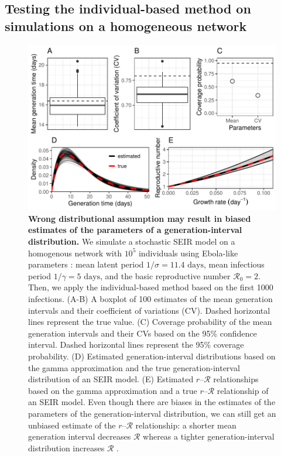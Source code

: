 \documentclass[12pt]{article}
\newcommand{\RR}{\ensuremath{{\mathcal R}}}
\begin{document}
\pagebreak

\subsection{Testing the individual-based method on simulations on a homogeneous network}

\begin{figure}[!h]
\includegraphics[width=\textwidth]{../fig/full_coverage_fig.pdf}
\caption{\textbf{Wrong distributional assumption may result in biased estimates of the parameters of a generation-interval distribution.}
We simulate a stochastic SEIR model on a homogenous network with $10^5$ individuals using Ebola-like parameters \citep{who2014ebola}: mean latent period $1/\sigma = 11.4 \textrm{ days}$, mean infectious period $1/\gamma = 5 \textrm{ days}$, and the basic reproductive number $\RR_0 = 2$. Then, we apply the individual-based method based on the first 1000 infections.
(A-B) A boxplot of 100 estimates of the mean generation intervals and their coefficient of variations (CV). 
Dashed horizontal lines represent the true value.
(C) Coverage probability of the mean generation intervals and their CVs based on the 95\% confidence interval.
Dashed horizontal lines represent the 95\% coverage probability.
(D) Estimated generation-interval distributions based on the gamma approximation and the true generation-interval distribution of an SEIR model.
(E) Estimated $r$--$\RR$ relationships based on the gamma approximation and a true $r$--$\RR$ relationship of an SEIR model.
Even though there are biases in the estimates of the parameters of the generation-interval distribution, we can still get an unbiased estimate of the $r$--$\RR$ relationship: a shorter mean generation interval decreases $\RR$ whereas a tighter generation-interval distribution increases $\RR$ \citep{wallinga2007generation, park2019practical}.
}
\label{fig:cover}
\end{figure}

\pagebreak


\end{document}
